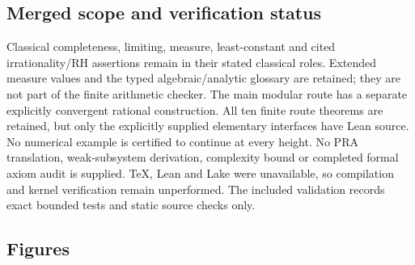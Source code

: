 \documentclass[11pt,reqno]{amsart}
\theoremstyle{blueplain}
\newcounter{type}
\newcounter{asser}
\numberwithin{equation}{section}
\def\hyperlink#1#2{#2}}
\begin{document}
\subsection{Merged scope and verification status}\label{sec:merged-status}
Classical completeness, limiting, measure, least-constant and cited
irrationality/\hyperlink{def:RH}{RH} assertions remain in their stated classical roles.
Extended measure values and the typed algebraic/analytic glossary are
retained; they are not part of the finite arithmetic checker. The main
modular route has a separate explicitly convergent rational construction. All ten finite
route theorems are retained, but only the explicitly supplied elementary
interfaces have Lean source. No numerical example is certified to
continue at every height. No \hyperlink{abbr:PRA}{PRA} translation, weak-subsystem derivation,
complexity bound or completed formal axiom audit is supplied. TeX,
Lean and Lake were unavailable, so compilation and kernel verification
remain unperformed. The included validation records exact bounded tests
and static source checks only.

\subsection{Figures}\label{sec:appendix-figures}
\end{document}
